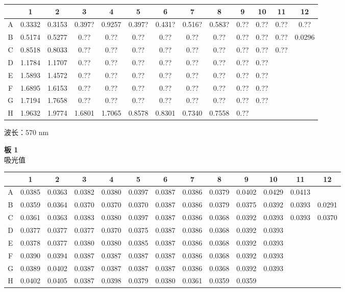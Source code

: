 \documentclass[UTF8,10pt,a4paper,fontset=fandol]{ctexart}
\begin{document}
\begin{center}
\begin{center}
\begin{center}
\scriptsize
\begin{tabular}{c|*{12}{c}}
 & 1 & 2 & 3 & 4 & 5 & 6 & 7 & 8 & 9 & 10 & 11 & 12\\
\hline
A & 0.3332 & 0.3153 & 0.397? & 0.9257 & 0.397? & 0.431? &
0.516? & 0.583? & 0.?? & 0.?? & 0.?? & 0.??\\
B & 0.5174 & 0.5277 & 0.?? & 0.?? & 0.?? & 0.?? &
0.?? & 0.?? & 0.?? & 0.?? & 0.?? & 0.0296\\
C & 0.8518 & 0.8033 & 0.?? & 0.?? & 0.?? & 0.?? &
0.?? & 0.?? & 0.?? & 0.?? & 0.?? & \\
D & 1.1784 & 1.1707 & 0.?? & 0.?? & 0.?? & 0.?? &
0.?? & 0.?? & 0.?? & 0.?? & & \\
E & 1.5893 & 1.4572 & 0.?? & 0.?? & 0.?? & 0.?? &
0.?? & 0.?? & 0.?? & 0.?? & & \\
F & 1.6895 & 1.6153 & 0.?? & 0.?? & 0.?? & 0.?? &
0.?? & 0.?? & 0.?? & 0.?? & & \\
G & 1.7194 & 1.7658 & 0.?? & 0.?? & 0.?? & 0.?? &
0.?? & 0.?? & 0.?? & 0.?? & & \\
H & 1.9632 & 1.9774 & 1.6801 & 1.7065 & 0.8578 & 0.8301 &
0.7340 & 0.7558 & 0.?? & & &
\end{tabular}
\end{center}


\vspace{1em}

波长：570 nm

\textbf{板 1}\\
吸光值

\begin{center}
\scriptsize
\begin{tabular}{c|*{12}{c}}
 & 1 & 2 & 3 & 4 & 5 & 6 & 7 & 8 & 9 & 10 & 11 & 12\\
\hline
A & 0.0385 & 0.0363 & 0.0382 & 0.0380 & 0.0397 & 0.0387 &
0.0386 & 0.0379 & 0.0402 & 0.0429 & 0.0413 & \\
B & 0.0359 & 0.0364 & 0.0370 & 0.0370 & 0.0370 & 0.0387 &
0.0386 & 0.0379 & 0.0375 & 0.0392 & 0.0393 & 0.0291\\
C & 0.0361 & 0.0363 & 0.0383 & 0.0380 & 0.0397 & 0.0387 &
0.0386 & 0.0368 & 0.0392 & 0.0393 & 0.0393 & 0.0370\\
D & 0.0377 & 0.0377 & 0.0377 & 0.0370 & 0.0375 & 0.0387 &
0.0386 & 0.0368 & 0.0392 & 0.0393 & & \\
E & 0.0378 & 0.0377 & 0.0380 & 0.0380 & 0.0385 & 0.0387 &
0.0386 & 0.0368 & 0.0392 & 0.0393 & & \\
F & 0.0390 & 0.0394 & 0.0387 & 0.0387 & 0.0387 & 0.0387 &
0.0386 & 0.0368 & 0.0392 & 0.0393 & & \\
G & 0.0389 & 0.0402 & 0.0387 & 0.0387 & 0.0387 & 0.0387 &
0.0386 & 0.0368 & 0.0392 & 0.0393 & & \\
H & 0.0402 & 0.0405 & 0.0387 & 0.0398 & 0.0379 & 0.0380 &
0.0361 & 0.0359 & 0.0359 & & &
\end{tabular}
\end{center}


\end{center}
\end{center}
\end{document}
